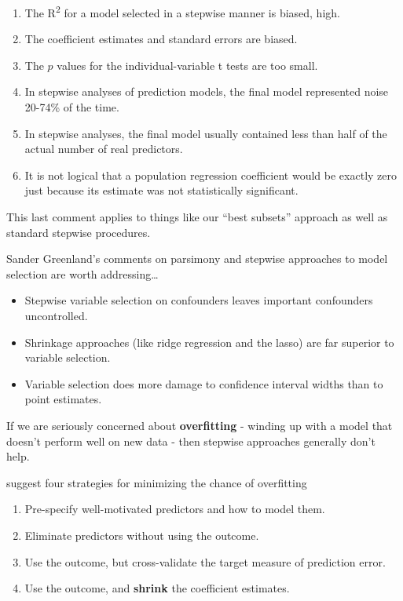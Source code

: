 \documentclass[]{book}
\providecommand{\tightlist}{%
  \setlength{\itemsep}{0pt}\setlength{\parskip}{0pt}}
\theoremstyle{definition}
\theoremstyle{definition}
\theoremstyle{definition}
\theoremstyle{remark}
\begin{document}
\begin{enumerate}
\def\labelenumi{\arabic{enumi}.}
\tightlist
\item
  The R\textsuperscript{2} for a model selected in a stepwise manner is
  biased, high.
\item
  The coefficient estimates and standard errors are biased.
\item
  The \(p\) values for the individual-variable t tests are too small.
\item
  In stepwise analyses of prediction models, the final model represented
  noise 20-74\% of the time.
\item
  In stepwise analyses, the final model usually contained less than half
  of the actual number of real predictors.
\item
  It is not logical that a population regression coefficient would be
  exactly zero just because its estimate was not statistically
  significant.
\end{enumerate}

This last comment applies to things like our ``best subsets'' approach
as well as standard stepwise procedures.

Sander Greenland's comments on parsimony and stepwise approaches to
model selection are worth addressing\ldots{}

\begin{itemize}
\tightlist
\item
  Stepwise variable selection on confounders leaves important
  confounders uncontrolled.
\item
  Shrinkage approaches (like ridge regression and the lasso) are far
  superior to variable selection.
\item
  Variable selection does more damage to confidence interval widths than
  to point estimates.
\end{itemize}

If we are seriously concerned about \textbf{overfitting} - winding up
with a model that doesn't perform well on new data - then stepwise
approaches generally don't help.

\citet{Vittinghoff2012} suggest four strategies for minimizing the
chance of overfitting

\begin{enumerate}
\def\labelenumi{\arabic{enumi}.}
\tightlist
\item
  Pre-specify well-motivated predictors and how to model them.
\item
  Eliminate predictors without using the outcome.
\item
  Use the outcome, but cross-validate the target measure of prediction
  error.
\item
  Use the outcome, and \textbf{shrink} the coefficient estimates.
\end{enumerate}
\end{document}
